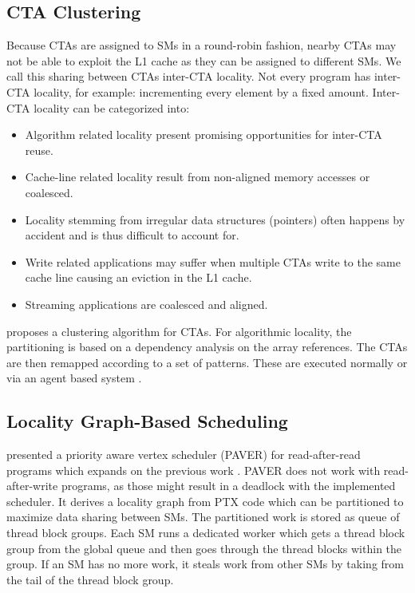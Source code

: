 \documentclass{article}
\newcommand{\TODO}[1]{\noindent{\color{red}\textbf{[TODO] #1}}}
\begin{document}
\subsection{CTA Clustering}
Because CTAs are assigned to SMs in a round-robin fashion, nearby CTAs may not be able to exploit the L1 cache as they can be assigned to different SMs.
We call this sharing between CTAs inter-CTA locality.
Not every program has inter-CTA locality, for example: incrementing every element by a fixed amount.
Inter-CTA locality can be categorized into:
\begin{itemize}
    \item Algorithm related locality present promising opportunities for inter-CTA reuse.
    \item Cache-line related locality result from non-aligned memory accesses or coalesced.
    \item Locality stemming from irregular data structures (pointers) often happens by accident and is thus difficult to account for.
    \item Write related applications may suffer when multiple CTAs write to the same cache line causing an eviction in the L1 cache.
    \item Streaming applications are coalesced and aligned.
\end{itemize}
\citet{li2017locality} proposes a clustering algorithm for CTAs.
For algorithmic locality, the partitioning is based on a dependency analysis on the array references.
The CTAs are then remapped according to a set of patterns.
These are executed normally or via an agent based system \cite{li2017locality}.
\TODO{Relate to proposal}

\subsection{Locality Graph-Based Scheduling}
\citeauthor{tripathy2021paver} presented a priority aware vertex scheduler (PAVER) for read-after-read programs which expands on the previous work \cite{tripathy2021paver}.
PAVER does not work with read-after-write programs, as those might result in a deadlock with the implemented scheduler.
It derives a locality graph from PTX code which can be partitioned to maximize data sharing between SMs.
The partitioned work is stored as queue of thread block groups.
Each SM runs a dedicated worker which gets a thread block group from the global queue and then goes through the thread blocks within the group.
If an SM has no more work, it steals work from other SMs by taking from the tail of the thread block group.
\end{document}
